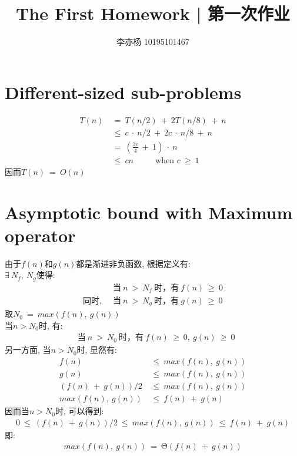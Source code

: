 \documentclass{article}
\begin{document}
 
 
 
\title{The First Homework  | 第一次作业}
\author{李亦杨 10195101467}
 
\maketitle

\section{Different-sized sub-problems}
\begin{align*}
T(n)\ &=\ T(n/2)\ +\ 2T(n/8)\ +\ n \\
&\leq \ c\ \cdot \ n/2\ +\ 2c\ \cdot\ n/8\ +\ n \\
&=\ (\frac{3c}{4}\ +\ 1)\ \cdot \ n \\
&\leq \ cn\ \ \ \ \ \ \ \ \ \ \ \ \mbox{when $c\ \geq \ 1$}
\end{align*}
因而$T(n)\ =\ O(n)$

\section{Asymptotic bound with Maximum operator}
由于$f(n)$和$g(n)$都是渐进非负函数, 根据定义有: \\
$\exists \ N_f,\ N_g$使得: 
\begin{align*}
& \mbox{当}\ n\ >\ N_f\ \mbox{时}，\mbox{有}\ f(n)\ \geq \ 0 \\
\mbox{同时, }\ & \mbox{当}\ n\ >\ N_g\ \mbox{时}，\mbox{有}\ g(n)\ \geq\ 0
\end{align*}
取$N_0\ =\ max(f(n),\ g(n))$\\
当$n > N_0$时, 有:
\begin{align*}
& \mbox{当}\ n\ >\ N_0\ \mbox{时}，\mbox{有}\ f(n)\ \geq\ 0,\ g(n)\ \geq\ 0
\end{align*}
另一方面, 当$n > N_0$时, 显然有: 
\begin{align*}
f(n)\ & \leq \ max(f(n),\ g(n)) \\
g(n)\ & \leq \ max(f(n),\ g(n)) \\
(f(n)\ +\ g(n))/2\ & \leq \ max(f(n),\ g(n)) \\
max(f(n),\ g(n))\ & \leq \ f(n)\ +\ g(n)
\end{align*}
因而当$n > N_0$时, 可以得到: 
\begin{align*}
0\ \leq\ (f(n)\ +\ g(n))/2\ \leq \  max(f(n),\ g(n)) \ \leq \ f(n)\ +\ g(n)
\end{align*}
即: 
\begin{align*}
max(f(n),\ g(n))\ =\ \mbox{Θ}(f(n)\ +\ g(n))
\end{align*}
\end{document}

